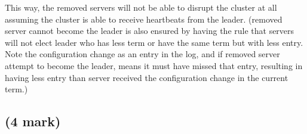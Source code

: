 \documentclass[11pt]{article}
\begin{document}
\begin{enumerate}
	This way,  the removed servers will not be able to disrupt the cluster at all assuming the cluster is able to receive heartbeats from the leader. (removed server cannot become the leader is also ensured by having the rule that servers will not elect leader who has less term or have the same term but with less entry. Note the configuration change as an entry in the log, and if removed server attempt to become the leader, means it must have missed that entry, resulting in having less entry than server received the configuration change in the current term.)
	
\end{enumerate}


\newpage
\subsection{(4 mark)}
\end{document}
